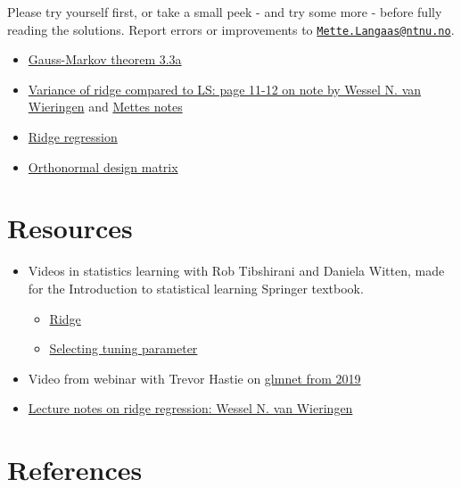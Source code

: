 \documentclass[
  letterpaper,
  DIV=11,
  numbers=noendperiod]{scrartcl}
\providecommand{\tightlist}{%
  \setlength{\itemsep}{0pt}\setlength{\parskip}{0pt}}\usepackage{longtable,booktabs,array}
\begin{document}
Please try yourself first, or take a small peek - and try some more -
before fully reading the solutions. Report errors or improvements to
\href{mailto:Mette.Langaas@ntnu.no}{\nolinkurl{Mette.Langaas@ntnu.no}}.

\begin{itemize}
\item
  \href{./ELSe33a.pdf}{Gauss-Markov theorem 3.3a}
\item
  \href{https://arxiv.org/pdf/1509.09169.pdf}{Variance of ridge compared
  to LS: page 11-12 on note by Wessel N. van Wieringen} and
  \href{./LSvsRRvar.pdf}{Mettes notes}
\item
  \href{./L2exRR1.pdf}{Ridge regression}
\item
  \href{./LSRRortho.pdf}{Orthonormal design matrix}
\end{itemize}

\hypertarget{resources}{%
\section{Resources}\label{resources}}

\begin{itemize}
\item
  Videos in statistics learning with Rob Tibshirani and Daniela Witten,
  made for the Introduction to statistical learning Springer textbook.

  \begin{itemize}
  \tightlist
  \item
    \href{https://www.youtube.com/watch?v=cSKzqb0EKS0}{Ridge}
  \item
    \href{https://www.youtube.com/watch?v=xMKVUstjXBE}{Selecting tuning
    parameter}
  \end{itemize}
\item
  Video from webinar with Trevor Hastie on
  \href{http://youtu.be/BU2gjoLPfDc}{glmnet from 2019}
\item
  \href{https://arxiv.org/pdf/1509.09169v7.pdf}{Lecture notes on ridge
  regression: Wessel N. van Wieringen}
\end{itemize}

\hypertarget{references}{%
\section{References}\label{references}}
\end{document}
